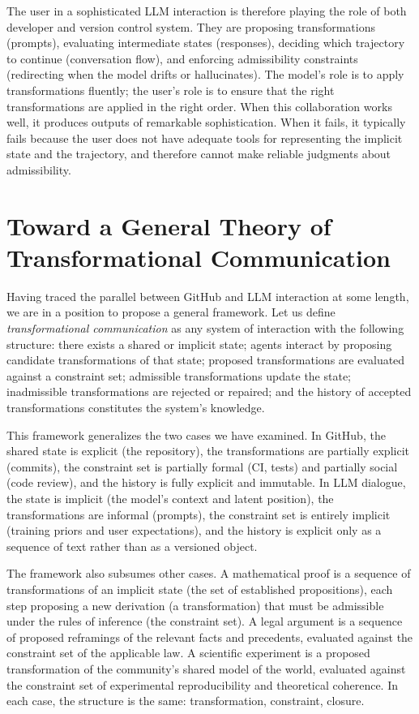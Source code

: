 \documentclass[12pt, letterpaper]{article}
\begin{document}
The user in a sophisticated LLM interaction is therefore playing the role of both developer and version control system. They are proposing transformations (prompts), evaluating intermediate states (responses), deciding which trajectory to continue (conversation flow), and enforcing admissibility constraints (redirecting when the model drifts or hallucinates). The model's role is to apply transformations fluently; the user's role is to ensure that the right transformations are applied in the right order. When this collaboration works well, it produces outputs of remarkable sophistication. When it fails, it typically fails because the user does not have adequate tools for representing the implicit state and the trajectory, and therefore cannot make reliable judgments about admissibility.

\section{Toward a General Theory of Transformational Communication}

Having traced the parallel between GitHub and LLM interaction at some length, we are in a position to propose a general framework. Let us define \emph{transformational communication} as any system of interaction with the following structure: there exists a shared or implicit state; agents interact by proposing candidate transformations of that state; proposed transformations are evaluated against a constraint set; admissible transformations update the state; inadmissible transformations are rejected or repaired; and the history of accepted transformations constitutes the system's knowledge.

This framework generalizes the two cases we have examined. In GitHub, the shared state is explicit (the repository), the transformations are partially explicit (commits), the constraint set is partially formal (CI, tests) and partially social (code review), and the history is fully explicit and immutable. In LLM dialogue, the state is implicit (the model's context and latent position), the transformations are informal (prompts), the constraint set is entirely implicit (training priors and user expectations), and the history is explicit only as a sequence of text rather than as a versioned object.

The framework also subsumes other cases. A mathematical proof is a sequence of transformations of an implicit state (the set of established propositions), each step proposing a new derivation (a transformation) that must be admissible under the rules of inference (the constraint set). A legal argument is a sequence of proposed reframings of the relevant facts and precedents, evaluated against the constraint set of the applicable law. A scientific experiment is a proposed transformation of the community's shared model of the world, evaluated against the constraint set of experimental reproducibility and theoretical coherence. In each case, the structure is the same: transformation, constraint, closure.
\end{document}
